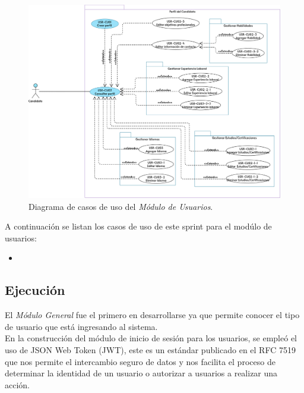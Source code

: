     \begin{figure}[H]
        \begin{center}
            \includegraphics[width=.7\textwidth]{sprints/imagenes/CUPUSR.png}
        \end{center}
        \caption{Diagrama de casos de uso del \textit{Módulo de Usuarios}.}
        \label{dcu:CUPUSR}
    \end{figure}

    A continuación se listan los casos de uso de este sprint para el modúlo de usuarios:
    \begin{itemize}
        \item {}
    \end{itemize} 


    \subsection{Ejecución}
        El \textit{Módulo General} fue el primero en desarrollarse ya que permite conocer el tipo de usuario
        que está ingresando al sistema.\\ 
        \newline        
        En la construcción del módulo de inicio de sesión para los usuarios, se empleó el uso de JSON Web Token (JWT), este es un 
        estándar publicado en el RFC 7519 que nos permite el intercambio seguro de datos y nos facilita el proceso de determinar la 
        identidad de un usuario o autorizar a usuarios a realizar una acción.

